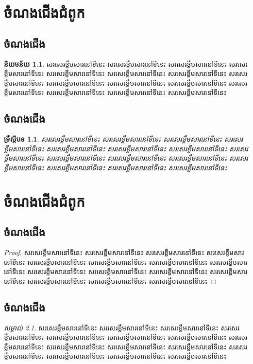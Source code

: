 \documentclass[a4paper,12pt]{book}
\theoremstyle{theorem}
\newtheorem{theorem}{ទ្រឹស្ដីបទ}[chapter]
\theoremstyle{definition}
\newtheorem{definition}{និយមន័យ}[chapter]
\theoremstyle{remark}
\newtheorem{remark}{សម្គាល់}[chapter]
\begin{document}
	\frontmatter
	\tableofcontents
	\mainmatter
	\chapter{ចំណងជើងជំពូក}
	\section{ចំណងជើង}
	\begin{definition}
		សរសេរខ្លឹមសារនៅទីនេះ សរសេរខ្លឹមសារនៅទីនេះ សរសេរខ្លឹមសារនៅទីនេះ សរសេរខ្លឹមសារនៅទីនេះ សរសេរខ្លឹមសារនៅទីនេះ សរសេរខ្លឹមសារនៅទីនេះ សរសេរខ្លឹមសារនៅទីនេះ សរសេរខ្លឹមសារនៅទីនេះ សរសេរខ្លឹមសារនៅទីនេះ សរសេរខ្លឹមសារនៅទីនេះ សរសេរខ្លឹមសារនៅទីនេះ សរសេរខ្លឹមសារនៅទីនេះ សរសេរខ្លឹមសារនៅទីនេះ សរសេរខ្លឹមសារនៅទីនេះ សរសេរខ្លឹមសារនៅទីនេះ 
	\end{definition}
	\section{ចំណងជើង}
	\begin{theorem}
		សរសេរខ្លឹមសារនៅទីនេះ សរសេរខ្លឹមសារនៅទីនេះ សរសេរខ្លឹមសារនៅទីនេះ សរសេរខ្លឹមសារនៅទីនេះ សរសេរខ្លឹមសារនៅទីនេះ សរសេរខ្លឹមសារនៅទីនេះ សរសេរខ្លឹមសារនៅទីនេះ សរសេរខ្លឹមសារនៅទីនេះ សរសេរខ្លឹមសារនៅទីនេះ សរសេរខ្លឹមសារនៅទីនេះ សរសេរខ្លឹមសារនៅទីនេះ សរសេរខ្លឹមសារនៅទីនេះ សរសេរខ្លឹមសារនៅទីនេះ សរសេរខ្លឹមសារនៅទីនេះ សរសេរខ្លឹមសារនៅទីនេះ 
	\end{theorem}
	\chapter{ចំណងជើងជំពូក}
	\section{ចំណងជើង}
	\begin{proof}
		សរសេរខ្លឹមសារនៅទីនេះ សរសេរខ្លឹមសារនៅទីនេះ សរសេរខ្លឹមសារនៅទីនេះ សរសេរខ្លឹមសារនៅទីនេះ សរសេរខ្លឹមសារនៅទីនេះ សរសេរខ្លឹមសារនៅទីនេះ សរសេរខ្លឹមសារនៅទីនេះ សរសេរខ្លឹមសារនៅទីនេះ សរសេរខ្លឹមសារនៅទីនេះ សរសេរខ្លឹមសារនៅទីនេះ សរសេរខ្លឹមសារនៅទីនេះ សរសេរខ្លឹមសារនៅទីនេះ សរសេរខ្លឹមសារនៅទីនេះ សរសេរខ្លឹមសារនៅទីនេះ សរសេរខ្លឹមសារនៅទីនេះ 
	\end{proof}
	\section{ចំណងជើង}
	\begin{remark}
		សរសេរខ្លឹមសារនៅទីនេះ សរសេរខ្លឹមសារនៅទីនេះ សរសេរខ្លឹមសារនៅទីនេះ សរសេរខ្លឹមសារនៅទីនេះ សរសេរខ្លឹមសារនៅទីនេះ សរសេរខ្លឹមសារនៅទីនេះ សរសេរខ្លឹមសារនៅទីនេះ សរសេរខ្លឹមសារនៅទីនេះ សរសេរខ្លឹមសារនៅទីនេះ សរសេរខ្លឹមសារនៅទីនេះ សរសេរខ្លឹមសារនៅទីនេះ សរសេរខ្លឹមសារនៅទីនេះ សរសេរខ្លឹមសារនៅទីនេះ សរសេរខ្លឹមសារនៅទីនេះ សរសេរខ្លឹមសារនៅទីនេះ 
	\end{remark}
	\appendix
\end{document}

